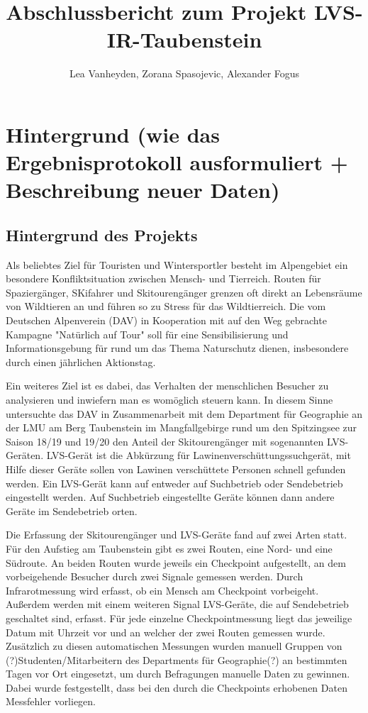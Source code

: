 \documentclass[11pt,a4paper]{report}
\title{Abschlussbericht zum Projekt LVS-IR-Taubenstein}
\author{Lea Vanheyden, Zorana Spasojevic, Alexander Fogus}
\begin{document}
	
\maketitle
	
\tableofcontents

\newpage

\chapter{Hintergrund (wie das Ergebnisprotokoll ausformuliert + Beschreibung neuer Daten)}

\section{Hintergrund des Projekts}
Als beliebtes Ziel für Touristen und Wintersportler besteht im Alpengebiet ein besondere Konfliktsituation zwischen Mensch- und Tierreich. Routen für Spaziergänger, SKifahrer und Skitourengänger grenzen oft direkt an Lebensräume von Wildtieren an und führen so zu Stress für das Wildtierreich. Die vom Deutschen Alpenverein (DAV) in Kooperation mit  auf den Weg gebrachte Kampagne "Natürlich auf Tour" soll für eine Sensibilisierung und Informationsgebung für rund um das Thema Naturschutz dienen, insbesondere durch einen jährlichen Aktionstag.

Ein weiteres Ziel ist es dabei, das Verhalten der menschlichen Besucher zu analysieren und inwiefern man es womöglich steuern kann. In diesem Sinne untersuchte das DAV in Zusammenarbeit mit dem Department für Geographie an der LMU am Berg Taubenstein im Mangfallgebirge rund um den Spitzingsee zur Saison 18/19 und 19/20 den Anteil der Skitourengänger mit sogenannten LVS-Geräten. LVS-Gerät ist die Abkürzung für Lawinenverschüttungssuchgerät, mit Hilfe dieser Geräte sollen von Lawinen verschüttete Personen schnell gefunden werden. Ein LVS-Gerät kann auf entweder auf Suchbetrieb oder Sendebetrieb eingestellt werden. Auf Suchbetrieb eingestellte Geräte können dann andere Geräte im Sendebetrieb orten.

Die Erfassung der Skitourengänger und LVS-Geräte fand auf zwei Arten statt. Für den Aufstieg am Taubenstein gibt es zwei Routen, eine Nord- und eine Südroute. An beiden Routen wurde jeweils ein Checkpoint aufgestellt, an dem vorbeigehende Besucher durch zwei Signale gemessen werden. Durch Infrarotmessung wird erfasst, ob ein Mensch am Checkpoint vorbeigeht. Außerdem werden mit einem weiteren Signal LVS-Geräte, die auf Sendebetrieb geschaltet sind, erfasst. Für jede einzelne Checkpointmessung liegt das jeweilige Datum mit Uhrzeit vor und an welcher der zwei Routen gemessen wurde.
Zusätzlich zu diesen automatischen Messungen wurden manuell Gruppen von (?)Studenten/Mitarbeitern des Departments für Geographie(?) an bestimmten Tagen vor Ort eingesetzt, um durch Befragungen manuelle Daten zu gewinnen. Dabei wurde festgestellt, dass bei den durch die Checkpoints erhobenen Daten Messfehler vorliegen.
\end{document}
